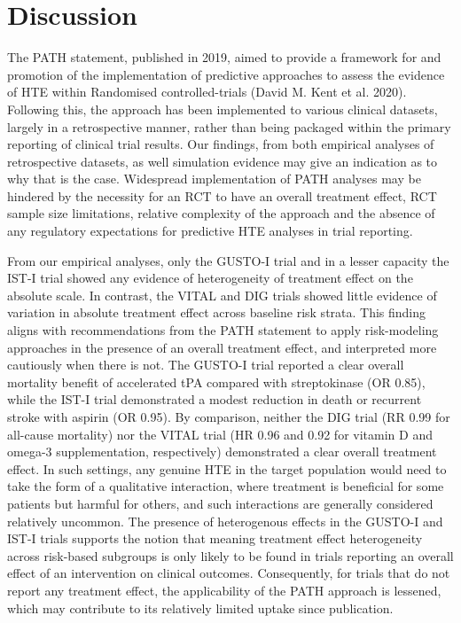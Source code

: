 \documentclass{article}
\begin{document}
\section{Discussion}\label{discussion}

The PATH statement, published in 2019, aimed to provide a framework for
and promotion of the implementation of predictive approaches to assess
the evidence of HTE within Randomised controlled-trials (David M. Kent
et al. 2020). Following this, the approach has been implemented to
various clinical datasets, largely in a retrospective manner, rather
than being packaged within the primary reporting of clinical trial
results. Our findings, from both empirical analyses of retrospective
datasets, as well simulation evidence may give an indication as to why
that is the case. Widespread implementation of PATH analyses may be
hindered by the necessity for an RCT to have an overall treatment
effect, RCT sample size limitations, relative complexity of the approach
and the absence of any regulatory expectations for predictive HTE
analyses in trial reporting.

From our empirical analyses, only the GUSTO-I trial and in a lesser
capacity the IST-I trial showed any evidence of heterogeneity of
treatment effect on the absolute scale. In contrast, the VITAL and DIG
trials showed little evidence of variation in absolute treatment effect
across baseline risk strata. This finding aligns with recommendations
from the PATH statement to apply risk-modeling approaches in the
presence of an overall treatment effect, and interpreted more cautiously
when there is not. The GUSTO-I trial reported a clear overall mortality
benefit of accelerated tPA compared with streptokinase (OR 0.85), while
the IST-I trial demonstrated a modest reduction in death or recurrent
stroke with aspirin (OR 0.95). By comparison, neither the DIG trial (RR
0.99 for all-cause mortality) nor the VITAL trial (HR 0.96 and 0.92 for
vitamin D and omega-3 supplementation, respectively) demonstrated a
clear overall treatment effect. In such settings, any genuine HTE in the
target population would need to take the form of a qualitative
interaction, where treatment is beneficial for some patients but harmful
for others, and such interactions are generally considered relatively
uncommon. The presence of heterogenous effects in the GUSTO-I and IST-I
trials supports the notion that meaning treatment effect heterogeneity
across risk-based subgroups is only likely to be found in trials
reporting an overall effect of an intervention on clinical outcomes.
Consequently, for trials that do not report any treatment effect, the
applicability of the PATH approach is lessened, which may contribute to
its relatively limited uptake since publication.
\end{document}

